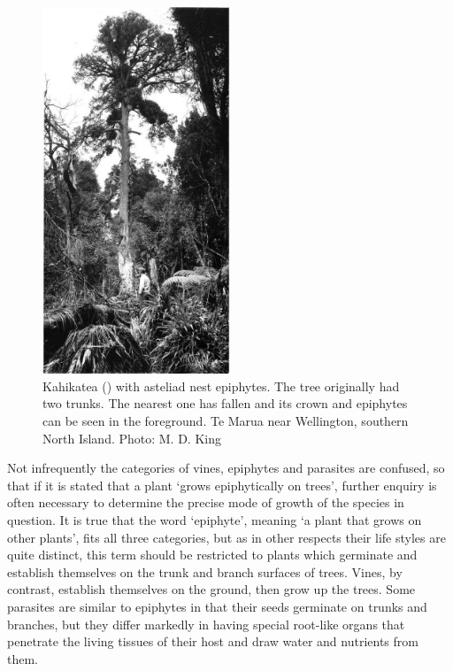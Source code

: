 \begin{figure}
	\includegraphics[width=0.5\textwidth]{graphics/figure26kahikatea.jpg}
	\centering
	\caption[Kahikatea with asteliad nest epiphytes]{Kahikatea () with asteliad nest epiphytes.
    The tree originally had two trunks.
    The nearest one has fallen and its crown and epiphytes can be seen in the foreground.
    Te Marua near Wellington, southern North Island.
	Photo: M. D. King}
	\label{fig:26kahikatea}
\end{figure}

Not infrequently the categories of vines, epiphytes and parasites are confused, so that if it is stated that a plant `grows epiphytically on trees', further enquiry is often necessary to determine the precise mode of growth of the species in question.
It is true that the word `epiphyte', meaning `a plant that grows on other plants', fits all three categories, but as in other respects their life styles are quite distinct, this term should be restricted to plants which germinate and establish themselves on the trunk and branch surfaces of trees.
Vines, by contrast, establish themselves on the ground, then grow up the trees.
Some parasites are similar to epiphytes in that their seeds germinate on trunks and branches, but they differ markedly in having special root-like organs that penetrate the living tissues of their host and draw water and nutrients from them.

